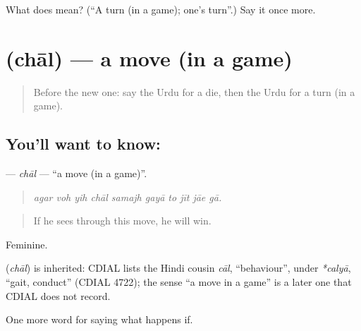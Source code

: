 \begin{tcolorbox}[breakable,colback=teal!4,colframe=teal!35!black,title={Before you move on}]
What does  mean? (\textquotedblleft{}A turn (in a game); one's turn\textquotedblright{}.) Say it once more.
\end{tcolorbox}
\section[\texorpdfstring{\ur{چال} (chāl)}{چال (chāl)}]{ (chāl) — a move (in a game)}

\label{lesson:UR-C533-chal}



\begin{quote}
Before the new one: say the Urdu for a die, then the Urdu for a turn (in a game).
\end{quote}

\subsection*{You'll want to know: }
\textbf{} — \emph{chāl} — \textquotedblleft{}a move (in a game)\textquotedblright{}.

\begin{quote}
         
\end{quote}

\begin{quote}
\emph{agar voh yih chāl samajh gayā to jīt jāe gā.}
\end{quote}

\begin{quote}
If he sees through this move, he will win.
\end{quote}

Feminine.

\begin{cousinweb}
\textbf{} (\emph{chāl}) is inherited: CDIAL lists the Hindi cousin \emph{cāl}, \textquotedblleft{}behaviour\textquotedblright{}, under \emph{*calyā}, \textquotedblleft{}gait, conduct\textquotedblright{} (CDIAL 4722); the sense \textquotedblleft{}a move in a game\textquotedblright{} is a later one that CDIAL does not record.
\end{cousinweb}

\begin{grammarlens}[title={What you've built}]
One more word for saying what happens if.
\end{grammarlens}

